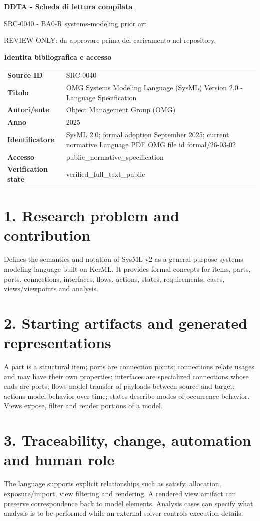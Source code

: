 \documentclass[10pt,a4paper]{article}
\newenvironment{factbox}[1]{\def\FrameCommand{\fcolorbox{ddtablue}{ddtagray}}\MakeFramed{\advance\hsize-2\width\FrameRestore}\noindent\textbf{#1}\par\smallskip}{\endMakeFramed}
\begin{document}
\begin{center}
{\LARGE\bfseries DDTA - Scheda di lettura compilata}\par
{\large SRC-0040 - BA0-R systems-modeling prior art}\par
{\small REVIEW-ONLY: da approvare prima del caricamento nel repository.}\par
\end{center}
\begin{factbox}{Identita bibliografica e accesso}
\begin{tabularx}{\linewidth}{>{\bfseries}p{3.4cm}X}
Source ID & SRC-0040\\
Titolo & OMG Systems Modeling Language (SysML) Version 2.0 - Language Specification\\
Autori/ente & Object Management Group (OMG)\\
Anno & 2025\\
Identificatore & SysML 2.0; formal adoption September 2025; current normative Language PDF OMG file id formal/26-03-02\\
Accesso & public\_normative\_specification\\
Verification state & verified\_full\_text\_public\\
\end{tabularx}
\end{factbox}
\section{1. Research problem and contribution}
Defines the semantics and notation of SysML v2 as a general-purpose systems modeling language built on KerML. It provides formal concepts for items, parts, ports, connections, interfaces, flows, actions, states, requirements, cases, views/viewpoints and analysis.
\section{2. Starting artifacts and generated representations}
A part is a structural item; ports are connection points; connections relate usages and may have their own properties; interfaces are specialized connections whose ends are ports; flows model transfer of payloads between source and target; actions model behavior over time; states describe modes of occurrence behavior. Views expose, filter and render portions of a model.
\section{3. Traceability, change, automation and human role}
The language supports explicit relationships such as satisfy, allocation, exposure/import, view filtering and rendering. A rendered view artifact can preserve correspondence back to model elements. Analysis cases can specify what analysis is to be performed while an external solver controls execution details.
\end{document}
